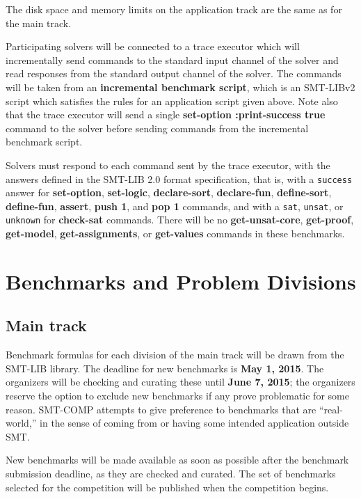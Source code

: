 \documentclass[12pt]{article}
\newcommand{\akey}[1]{\textbf{#1}}
\begin{document}
The disk space and memory limits on the application track are the same
as for the main track.

%
Participating solvers will be connected to a trace executor which will
incrementally send commands to the standard input channel of the
solver and read responses from the standard output channel of the
solver.  The commands will be taken from an \textbf{incremental
  benchmark script}, which is an SMT-LIBv2 script which satisfies the
rules for an application script given above.  Note also that the trace
executor will send a single \akey{set-option :print-success true}
command to the solver before sending commands from the incremental
benchmark script.

Solvers must respond to each command sent by the trace executor, with
the answers defined in the SMT-LIB 2.0 format specification, that is,
with a \texttt{success} answer for \akey{set-option},
\akey{set-logic}, \akey{declare-sort}, \akey{declare-fun},
\akey{define-sort}, \akey{define-fun}, \akey{assert}, \akey{push 1},
and \akey{pop 1} commands, and with a \texttt{sat}, \texttt{unsat}, or
\texttt{unknown} for \akey{check-sat} commands. There will be no
\akey{get-unsat-core}, \akey{get-proof}, \akey{get-model},
\akey{get-assignments}, or \akey{get-values} commands in these
benchmarks.


\section{Benchmarks and Problem Divisions}
\label{sec:theories}

\subsection{Main track}

%
Benchmark formulas for each division of the main track will be drawn
from the SMT-LIB library. The deadline for new benchmarks is {\bf May
  1, 2015}. The organizers will be checking and curating these until
{\bf June 7, 2015}; the organizers reserve the option to exclude new
benchmarks if any prove problematic for some reason.  SMT-COMP
attempts to give preference to benchmarks that are ``real-world,'' in
the sense of coming from or having some intended application outside
SMT.

%
New benchmarks will be made available as soon as possible after the
benchmark submission deadline, as they are checked and curated.  The
set of benchmarks selected for the competition will be published when
the competition begins.
\end{document}
